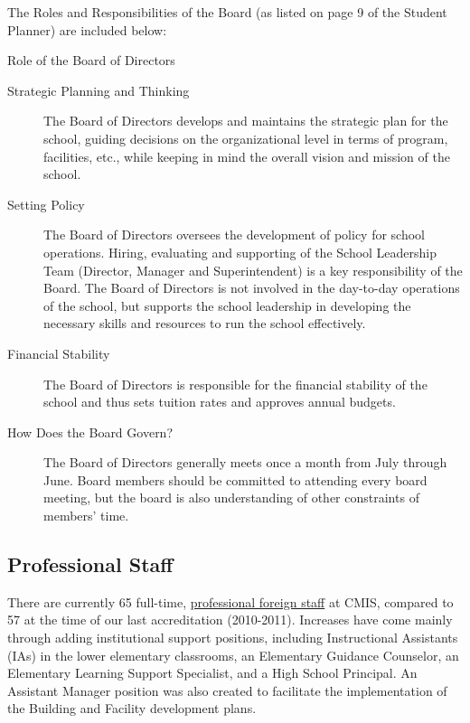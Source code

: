 The Roles and Responsibilities of the Board (as listed on page 9 of the Student Planner) are included below:

Role of the Board of Directors
\begin{description}
\item [Strategic Planning and Thinking] The Board of Directors develops and maintains the strategic plan for the school, guiding decisions on the organizational level in terms of program, facilities, etc., while keeping in mind the overall vision and mission of the school.
\item [Setting Policy] The Board of Directors oversees the development of policy for school operations. Hiring, evaluating and supporting of the School Leadership Team (Director, Manager and Superintendent) is a key responsibility of the Board. The Board of Directors is not involved in the day-to-day operations of the school, but supports the school leadership in developing the necessary skills and resources to run the school effectively.
\item [Financial Stability] The Board of Directors is responsible for the financial stability of the school and thus sets tuition rates and approves annual budgets.
\item [How Does the Board Govern?] The Board of Directors generally meets once a month from July through June.  Board members should be committed to attending every board meeting, but the board is also understanding of other constraints of members’ time.
\end{description}

\subsection{Professional Staff}

There are currently 65 full-time, \href{http://cmis.ac.th/about/faculty}{professional foreign staff} at CMIS, compared to 57 at the time of our last accreditation (2010-2011).  Increases have come mainly through adding institutional support positions, including Instructional Assistants (IAs) in the lower elementary classrooms, an Elementary Guidance Counselor, an Elementary Learning Support Specialist, and a High School Principal.  An Assistant Manager position was also created to facilitate the implementation of the Building and Facility development plans.  



